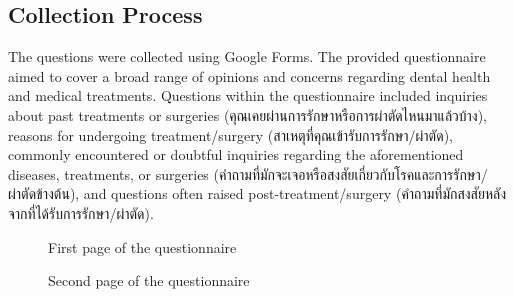 \documentclass[12pt,oneside,openright,a4paper]{cpe-english-project}
\begin{document}
    \subsection{Collection Process}
      \qquad The questions were collected using Google Forms. The provided questionnaire aimed to cover a broad range of opinions and concerns regarding dental health and medical treatments. Questions within the questionnaire included inquiries about past treatments or surgeries (\textthai{คุณเคยผ่านการรักษาหรือการผ่าตัดไหนมาแล้วบ้าง}), reasons for undergoing treatment/surgery (\textthai{สาเหตุที่คุณเข้ารับการรักษา/ผ่าตัด}), commonly encountered or doubtful inquiries regarding the aforementioned diseases, treatments, or surgeries (\textthai{คำถามที่มักจะเจอหรือสงสัยเกี่ยวกับโรคและการรักษา/ผ่าตัดข้างต้น}), and questions often raised post-treatment/surgery (\textthai{คำถามที่มักสงสัยหลังจากที่ได้รับการรักษา/ผ่าตัด}). \par
      \begin{figure}[!h]
        \centering
        \caption{First page of the questionnaire}\label{fig:Survey_1}
      \end{figure}
      \begin{figure}[!h]
        \centering
        \caption{Second page of the questionnaire}\label{fig:Survey_2}
      \end{figure}
\end{document}
